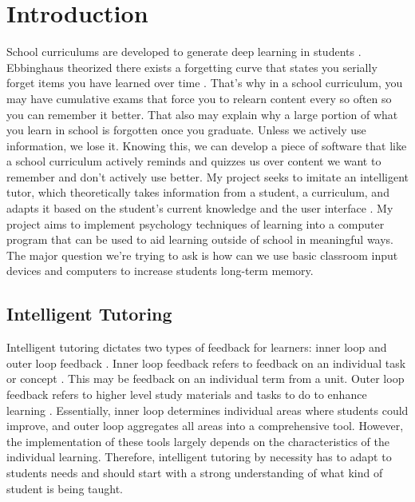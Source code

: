 \documentclass[acmtog]{acmart}
\begin{document}



\maketitle

\section{Introduction}
School curriculums are developed to generate deep learning in students \cite{zuo2021higher}. Ebbinghaus theorized there exists a forgetting curve that states you serially forget items you have learned over time \cite{murre2015replication}. That’s why in a school curriculum, you may have cumulative exams that force you to relearn content every so often so you can remember it better. That also may explain why a large portion of what you learn in school is forgotten once you graduate. Unless we actively use information, we lose it. Knowing this, we can develop a piece of software that like a school curriculum actively reminds and quizzes us over content we want to remember and don’t actively use better. My project seeks to imitate an intelligent tutor, which theoretically takes information from a student, a curriculum, and adapts it based on the student’s current knowledge and the user interface \cite{bradavc2017intelligent}. My project aims to implement psychology techniques of learning into a computer program that can be used to aid learning outside of school in meaningful ways. The major question we're trying to ask is how can we use basic classroom input devices and computers to increase students long-term memory.



\subsection{Intelligent Tutoring}
Intelligent tutoring dictates two types of feedback for learners: inner loop and outer loop feedback \cite{tacoma2021combined}. Inner loop feedback refers to feedback on an individual task or concept \cite{tacoma2021combined}. This may be feedback on an individual term from a unit. Outer loop feedback refers to higher level study materials and tasks to do to enhance learning \cite{tacoma2021combined}. Essentially, inner loop determines individual areas where students could improve, and outer loop aggregates all areas into a comprehensive tool. However, the implementation of these tools largely depends on the characteristics of the individual learning. Therefore, intelligent tutoring by necessity has to adapt to students needs and should start with a strong understanding of what kind of student is being taught.
\end{document}
